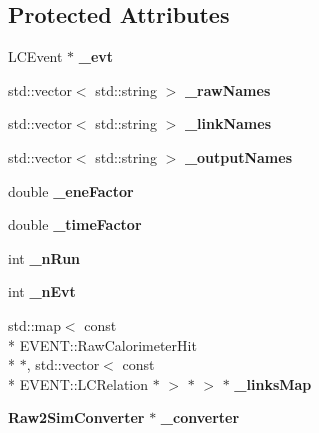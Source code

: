\subsection*{Protected Attributes}
\begin{DoxyCompactItemize}
\item 
L\-C\-Event $\ast$ {\bfseries \-\_\-evt}\label{classdigisim_1_1SimCalorimeterHitsProcessor_abd5a88f643a6ff8b4a2f42bca5909fe8}

\item 
std\-::vector$<$ std\-::string $>$ {\bfseries \-\_\-raw\-Names}\label{classdigisim_1_1SimCalorimeterHitsProcessor_ae70e4f720684c6836f7341b639b32f17}

\item 
std\-::vector$<$ std\-::string $>$ {\bfseries \-\_\-link\-Names}\label{classdigisim_1_1SimCalorimeterHitsProcessor_a969829cd4ae399f8012ee38c790bd6fa}

\item 
std\-::vector$<$ std\-::string $>$ {\bfseries \-\_\-output\-Names}\label{classdigisim_1_1SimCalorimeterHitsProcessor_ac30ad5b4d57c5c983a6c840ca3a988ee}

\item 
double {\bfseries \-\_\-ene\-Factor}\label{classdigisim_1_1SimCalorimeterHitsProcessor_a7be096df555305c582986a4048c2db66}

\item 
double {\bfseries \-\_\-time\-Factor}\label{classdigisim_1_1SimCalorimeterHitsProcessor_a89c7b96076328bd999480165b9b8993c}

\item 
int {\bfseries \-\_\-n\-Run}\label{classdigisim_1_1SimCalorimeterHitsProcessor_abf27722a302a66a718722009882e37af}

\item 
int {\bfseries \-\_\-n\-Evt}\label{classdigisim_1_1SimCalorimeterHitsProcessor_a78e7e5a57ea47b1fe85d8335d73e360b}

\item 
std\-::map$<$ const \\*
E\-V\-E\-N\-T\-::\-Raw\-Calorimeter\-Hit \\*
$\ast$, std\-::vector$<$ const \\*
E\-V\-E\-N\-T\-::\-L\-C\-Relation $\ast$ $>$ $\ast$ $>$ $\ast$ {\bfseries \-\_\-links\-Map}\label{classdigisim_1_1SimCalorimeterHitsProcessor_a4391c1811ba2ccea77a3c1a0df009151}

\item 
{\bf Raw2\-Sim\-Converter} $\ast$ {\bfseries \-\_\-converter}\label{classdigisim_1_1SimCalorimeterHitsProcessor_a6943e3c363a9272114a8b9f523c88486}

\end{DoxyCompactItemize}
